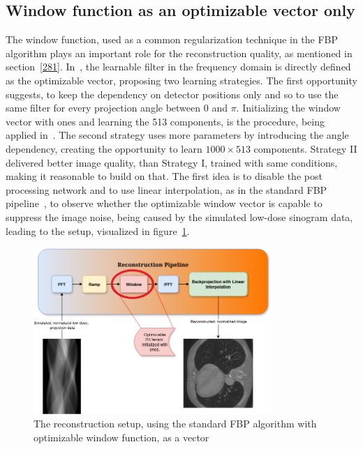 \documentclass[12pt,a4paper]{article}
\begin{document}
\subsection{Window function as an optimizable vector only}
The window function, used as a common regularization technique in the FBP algorithm plays an important role for the reconstruction quality, as mentioned in section~\ref{281}. In~\cite{DeepFBP_CT}, the learnable filter in the frequency domain is directly defined as the optimizable vector, proposing two learning strategies.
\newline\newline
The first opportunity suggests, to keep the dependency on detector positions only and so to use the same filter for every projection angle between $0$ and $\pi$. Initializing the window vector with ones and learning the 513 components, is the procedure, being applied in~\cite{DeepFBP_CT}. The second strategy uses more parameters by introducing the angle dependency, creating the opportunity to learn $1000 \times 513$ components.
\newline\newline
Strategy II delivered better image quality, than Strategy I, trained with same conditions, making it reasonable to build on that. The first idea is to disable the post processing network and to use linear interpolation, as in the standard FBP pipeline~\cite{DeepFBP_CT}, to observe whether the optimizable window vector is capable to suppress the image noise, being caused by the simulated low-dose sinogram data, leading to the setup, visualized in figure~\ref{fig:experiment1_setup}.
\begin{figure}[h!]
    \centering
    \includegraphics[width=0.8\textwidth]{Bachelorthesis//UsedImages/experiment1.png}
    \caption{The reconstruction setup, using the standard FBP algorithm with optimizable window function, as a vector}
    \label{fig:experiment1_setup}
\end{figure}
\end{document}
